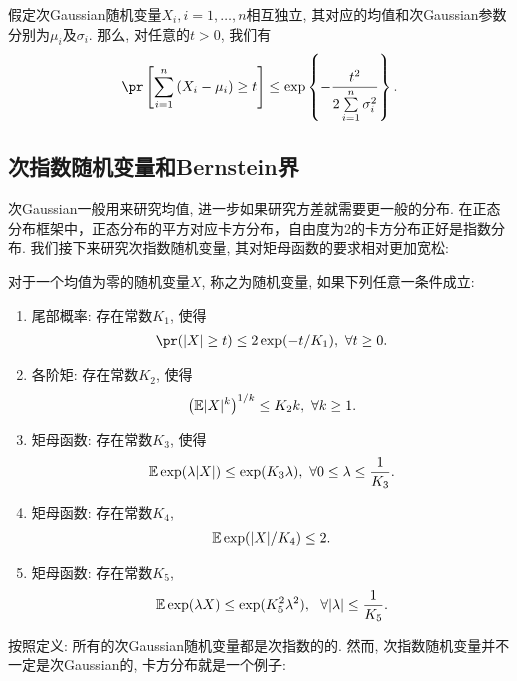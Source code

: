   \begin{prop}[Hoeffding界]\label{prop:2.5}
  假定次Gaussian随机变量$X_{i}, i=1,\ldots,n$相互独立, 其对应的均值和次Gaussian参数分别为$\mu_{i}$及$\sigma_{i}$. 那么, 对任意的$t>0$, 我们有
	\begin{align*}
	  \pr\left[\sum_{i=1}^{n}\left(X_{i}-\mu_{i}\right) \geq t\right] \leq \exp \left\{-\frac{t^{2}}{2 \sum\limits_{i=1}^{n} \sigma_{i}^{2}}\right\}.
	\end{align*}
  \end{prop}


  \subsection{次指数随机变量和Bernstein界}
  次Gaussian一般用来研究均值, 进一步如果研究方差就需要更一般的分布. 在正态分布框架中，正态分布的平方对应卡方分布，自由度为2的卡方分布正好是指数分布. 我们接下来研究次指数随机变量, 其对矩母函数的要求相对更加宽松:
	\begin{defin}[次指数分布]
对于一个均值为零的随机变量$X$, 称之为随机变量, 如果下列任意一条件成立:
\begin{enumerate}
	\item 尾部概率: 存在常数$K_1$, 使得
	\begin{align*}
		\pr(|X|\geq t) \leq 2 \exp(-t/K_1),~\forall t \geq 0.
	\end{align*}
	\item 各阶矩: 存在常数$K_2$, 使得
	\begin{align*}
		\left( \mathbb{E} |X|^k  \right)^{1/k} \leq K_2 k,~\forall k \geq 1.
	\end{align*}
	\item 矩母函数: 存在常数$K_3$, 使得
	\begin{align*}
		\mathbb{E} \exp(\lambda |X|) \leq \exp(K_3 \lambda),~\forall 0 \leq \lambda \leq \frac{1}{K_3}.
	\end{align*}
	\item 矩母函数: 存在常数$K_4$,
	\begin{align*}
		\mathbb{E} \exp(|X|/K_4) \leq 2.
	\end{align*}
	\item 矩母函数: 存在常数$K_5$,
	\begin{align*}
		\mathbb{E} \exp(\lambda X) \leq \exp(K_5^2 \lambda^2),~~\forall |\lambda| \leq \frac{1}{K_5}.
	\end{align*}
\end{enumerate}
	\end{defin}
按照定义: 所有的次Gaussian随机变量都是次指数的的. 然而, 次指数随机变量并不一定是次Gaussian的, 卡方分布就是一个例子:
